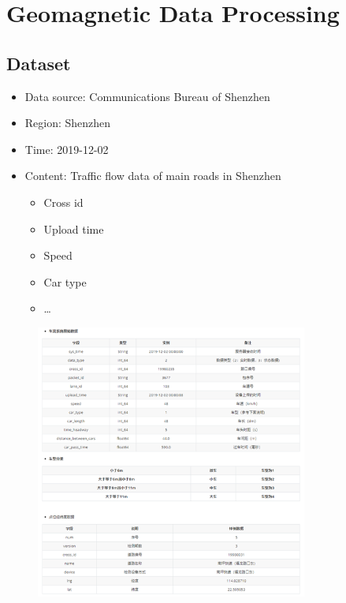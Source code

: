 \documentclass[fontset=none]{ctexart}
\theoremstyle{definition}
\theoremstyle{remark}
\begin{document}
\clearpage
\section{Geomagnetic Data Processing}
\subsection{Dataset}
\begin{itemize}
  \item Data source: Communications Bureau of Shenzhen 
  \item Region: Shenzhen
  \item Time: 2019-12-02
  \item Content: Traffic flow data of main roads in Shenzhen
    \begin{itemize}
      \item Cross id
      \item Upload time
      \item Speed
      \item Car type
      \item \dots
    \end{itemize}
\end{itemize}
\begin{figure}[htb]
  \centering
  \includegraphics[width=0.8\textwidth]{images/7-3-1.png}
  \label{fig: 731}
\end{figure}
\end{document}
